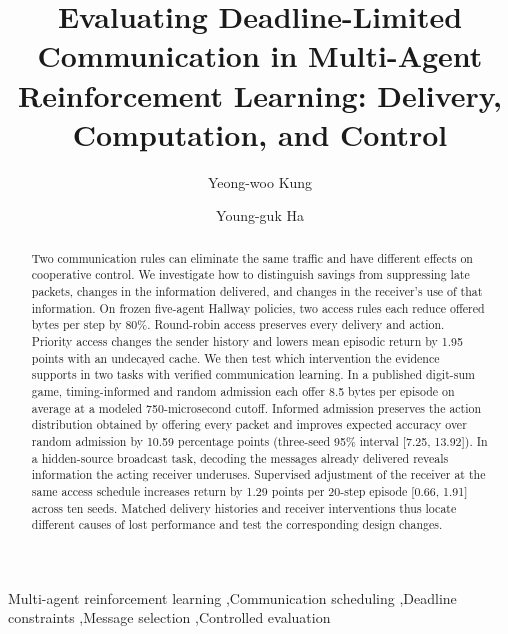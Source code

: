 \documentclass[a4paper,fleqn]{cas-dc}
\begin{document}
\let\WriteBookmarks\relax
{}
\title[mode=title]{Evaluating Deadline-Limited Communication in Multi-Agent Reinforcement Learning: Delivery, Computation, and Control}
\author[1]{Yeong-woo Kung}
\author[1]{Young-guk Ha}
\cormark[1]
\begin{abstract}
Two communication rules can eliminate the same traffic and have different effects on cooperative control. We investigate how to distinguish savings from suppressing late packets, changes in the information delivered, and changes in the receiver's use of that information. On frozen five-agent Hallway policies, two access rules each reduce offered bytes per step by 80\%. Round-robin access preserves every delivery and action. Priority access changes the sender history and lowers mean episodic return by 1.95 points with an undecayed cache. We then test which intervention the evidence supports in two tasks with verified communication learning. In a published digit-sum game, timing-informed and random admission each offer 8.5 bytes per episode on average at a modeled 750-microsecond cutoff. Informed admission preserves the action distribution obtained by offering every packet and improves expected accuracy over random admission by 10.59 percentage points (three-seed 95\% interval [7.25, 13.92]). In a hidden-source broadcast task, decoding the messages already delivered reveals information the acting receiver underuses. Supervised adjustment of the receiver at the same access schedule increases return by 1.29 points per 20-step episode [0.66, 1.91] across ten seeds. Matched delivery histories and receiver interventions thus locate different causes of lost performance and test the corresponding design changes.

\end{abstract}
\begin{keywords}
Multi-agent reinforcement learning \sep Communication scheduling \sep Deadline constraints \sep Message selection \sep Controlled evaluation
\end{keywords}
\renewcommand{\printorcid}{}
\maketitle
\end{document}
